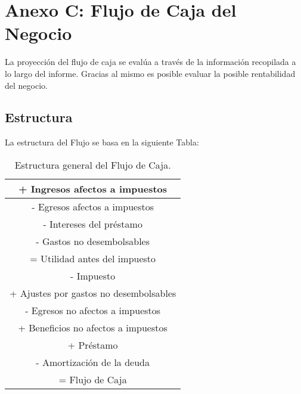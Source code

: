 \section{Anexo C: Flujo de Caja del Negocio}
La proyección del flujo de caja se evalúa a través de la información recopilada a lo largo del informe. Gracias al mismo es posible evaluar la posible rentabilidad del negocio.

\subsection{Estructura}
La estructura del Flujo se basa en la siguiente Tabla:

\begin{table}[H]
  \centering
    \begin{tabular}{|c|}
    \hline
    \textcolor[rgb]{ 0,  .69,  .314}{+ Ingresos afectos a impuestos} \bigstrut\\
    \hline
    \textcolor[rgb]{ 1,  0,  0}{- Egresos afectos a impuestos} \bigstrut\\
    \hline
    \textcolor[rgb]{ 1,  0,  0}{- Intereses del préstamo} \bigstrut\\
    \hline
    \textcolor[rgb]{ 1,  0,  0}{- Gastos no desembolsables} \bigstrut\\
    \hline
    \textcolor[rgb]{ 0,  .439,  .753}{= Utilidad antes del impuesto} \bigstrut\\
    \hline
    \textcolor[rgb]{ 1,  0,  0}{- Impuesto} \bigstrut\\
    \hline
    \textcolor[rgb]{ 0,  .69,  .314}{+ Ajustes por gastos no desembolsables} \bigstrut\\
    \hline
    \textcolor[rgb]{ 1,  0,  0}{- Egresos no afectos a impuestos} \bigstrut\\
    \hline
    \textcolor[rgb]{ 0,  .69,  .314}{+ Beneficios no afectos a impuestos} \bigstrut\\
    \hline
    \textcolor[rgb]{ 0,  .69,  .314}{+ Préstamo} \bigstrut\\
    \hline
    \textcolor[rgb]{ 1,  0,  0}{- Amortización de la deuda} \bigstrut\\
    \hline
    \textcolor[rgb]{ 0,  .439,  .753}{= Flujo de Caja} \bigstrut\\
    \hline
    \end{tabular}%
      \caption{Estructura general del Flujo de Caja.}
  \label{tab:estructura}%
\end{table}%

